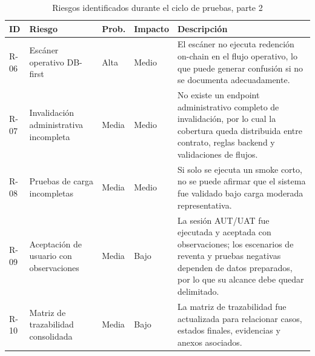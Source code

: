 \documentclass[12pt,letterpaper]{article}
\begin{document}
\begin{table}[H]
\centering
\begingroup
\scriptsize
\setlength{\tabcolsep}{2.5pt}
\renewcommand{\arraystretch}{1.18}

\begin{tabularx}{\textwidth}{|
>{\centering\arraybackslash}p{1.1cm}|
>{\raggedright\arraybackslash}p{3.4cm}|
>{\centering\arraybackslash}p{1.8cm}|
>{\centering\arraybackslash}p{1.6cm}|
>{\raggedright\arraybackslash}X|}
\hline
\textbf{ID} & \textbf{Riesgo} & \textbf{Prob.} & \textbf{Impacto} & \textbf{Descripción} \\
\hline
R-06 & Escáner operativo DB-first & Alta & Medio & El escáner no ejecuta redención on-chain en el flujo operativo, lo que puede generar confusión si no se documenta adecuadamente. \\
\hline
R-07 & Invalidación administrativa incompleta & Media & Medio & No existe un endpoint administrativo completo de invalidación, por lo cual la cobertura queda distribuida entre contrato, reglas backend y validaciones de flujos. \\
\hline
R-08 & Pruebas de carga incompletas & Media & Medio & Si solo se ejecuta un smoke corto, no se puede afirmar que el sistema fue validado bajo carga moderada representativa. \\
\hline
R-09 & Aceptación de usuario con observaciones & Media & Bajo & La sesión AUT/UAT fue ejecutada y aceptada con observaciones; los escenarios de reventa y pruebas negativas dependen de datos preparados, por lo que su alcance debe quedar delimitado. \\
\hline
R-10 & Matriz de trazabilidad consolidada & Media & Bajo & La matriz de trazabilidad fue actualizada para relacionar casos, estados finales, evidencias y anexos asociados. \\
\hline
\end{tabularx}

\endgroup
\caption{Riesgos identificados durante el ciclo de pruebas, parte 2}
\label{tab:riesgos-identificados-2}
\end{table}
\end{document}
